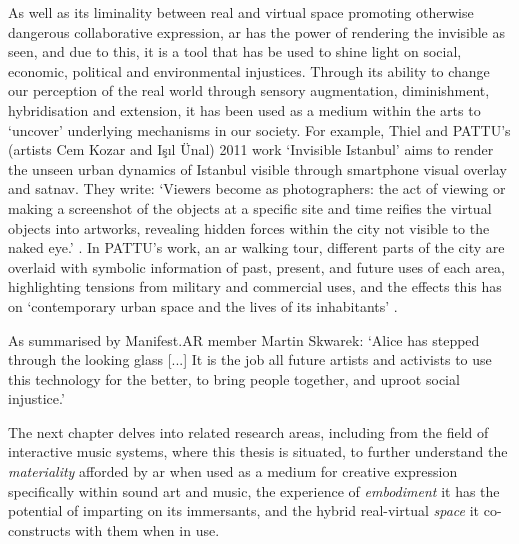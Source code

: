 As well as its liminality between real and virtual space promoting otherwise dangerous collaborative expression, \gls{ar} has the power of rendering the invisible as seen, and due to this, it is a tool that has be used to shine light on social, economic, political and environmental injustices. Through its ability to change our perception of the real world through sensory augmentation, diminishment, hybridisation and extension, it has been used as a medium within the arts to `uncover' underlying mechanisms in our society. For example, Thiel and PATTU's (artists Cem Kozar and Işıl Ünal) 2011 work `Invisible Istanbul' aims to render the unseen urban dynamics of Istanbul visible through smartphone visual overlay and \gls{satnav}. They write: `Viewers become as photographers: the act of viewing or making a screenshot of the objects at a specific site and time reifies the virtual objects into artworks, revealing hidden forces within the city not visible to the naked eye.' \citeyearpar{thiel2011}. In PATTU's work, an \gls{ar} walking tour, different parts of the city are overlaid with symbolic information of past, present, and future uses of each area, highlighting tensions from military and commercial uses, and the effects this has on `contemporary urban space and the lives of its inhabitants' \citeyearpar{thiel2018}.

As summarised by Manifest.AR member Martin Skwarek: `Alice has stepped through the looking glass [...] It is the job all future artists and activists to use this technology for the better, to bring people together, and uproot social injustice.' \citeyearpar{skwarek2018}

The next chapter delves into related research areas, including from the field of interactive music systems, where this thesis is situated, to further understand the \textit{materiality} afforded by \gls{ar} when used as a medium for creative expression specifically within sound art and music, the experience of \textit{embodiment} it has the potential of imparting on its immersants, and the hybrid real-virtual \textit{space} it co-constructs with them when in use.